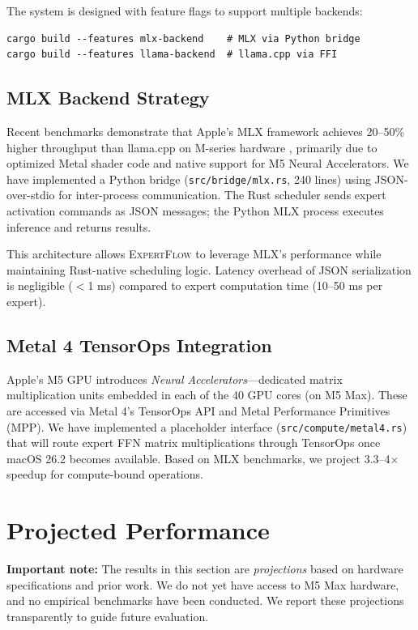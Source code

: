 \documentclass[11pt]{article}
\begin{document}
The system is designed with feature flags to support multiple backends:
\begin{verbatim}
cargo build --features mlx-backend    # MLX via Python bridge
cargo build --features llama-backend  # llama.cpp via FFI
\end{verbatim}

\subsection{MLX Backend Strategy}

Recent benchmarks demonstrate that Apple's MLX framework achieves 20--50\% higher throughput than llama.cpp on M-series hardware \cite{mlx2026}, primarily due to optimized Metal shader code and native support for M5 Neural Accelerators. We have implemented a Python bridge (\texttt{src/bridge/mlx.rs}, 240 lines) using JSON-over-stdio for inter-process communication. The Rust scheduler sends expert activation commands as JSON messages; the Python MLX process executes inference and returns results.

This architecture allows \textsc{ExpertFlow} to leverage MLX's performance while maintaining Rust-native scheduling logic. Latency overhead of JSON serialization is negligible ($<$1 ms) compared to expert computation time (10--50 ms per expert).

\subsection{Metal 4 TensorOps Integration}

Apple's M5 GPU introduces \textit{Neural Accelerators}—dedicated matrix multiplication units embedded in each of the 40 GPU cores (on M5 Max). These are accessed via Metal 4's TensorOps API and Metal Performance Primitives (MPP). We have implemented a placeholder interface (\texttt{src/compute/metal4.rs}) that will route expert FFN matrix multiplications through TensorOps once macOS 26.2 becomes available. Based on MLX benchmarks, we project 3.3--4$\times$ speedup for compute-bound operations.

\section{Projected Performance}
\label{sec:performance}

\textbf{Important note:} The results in this section are \textit{projections} based on hardware specifications and prior work. We do not yet have access to M5 Max hardware, and no empirical benchmarks have been conducted. We report these projections transparently to guide future evaluation.
\end{document}
